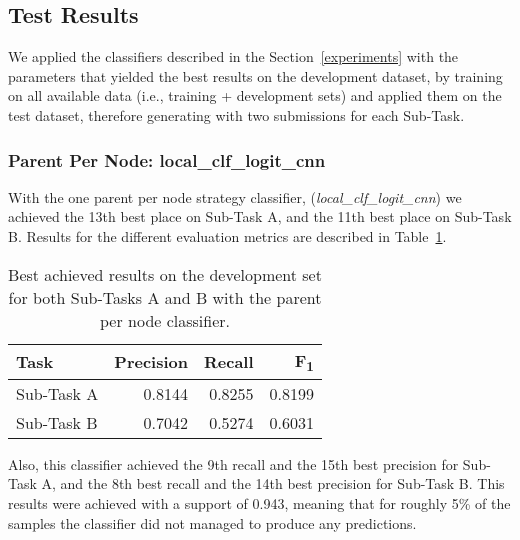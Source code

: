 \documentclass[11pt,a4paper]{article}
\begin{document}
\subsection{Test Results}

We applied the classifiers described in the Section~\ref{experiments} with the
parameters that yielded the best results on the development dataset, by training
on all available data (i.e., training + development sets) and applied them
on the test dataset, therefore generating with two submissions for each Sub-Task.

\subsubsection{Parent Per Node: local\_clf\_logit\_cnn}

With the one parent per node strategy classifier, (\textit{local\_clf\_logit\_cnn})
we achieved the 13th best place on Sub-Task A, and the 11th best place on
Sub-Task B. Results for the different evaluation metrics are described in
Table~\ref{local_devset-results}.

\begin{table}[!h]
\begin{center}
\begin{tabular}{|l|r|r|r|}
\hline\centering\textbf{Task}  & \textbf{Precision} &  \textbf{Recall} &  \textbf{F\textsubscript{1}}\\
\hline
 Sub-Task A   &  0.8144 & 0.8255 & 0.8199 \\
 Sub-Task B   &  0.7042 & 0.5274 & 0.6031 \\
\hline
\end{tabular}
\end{center}
\caption{\label{local_devset-results} Best achieved results on the development
          set for both Sub-Tasks A and B with the parent per node classifier.}
\end{table}

Also, this classifier achieved the 9th recall and the 15th best precision
for Sub-Task A, and the 8th best recall and the 14th best precision for Sub-Task B.
This results were achieved with a support of 0.943, meaning that for
roughly 5\% of the samples the classifier did not managed to produce any
predictions.
\end{document}
